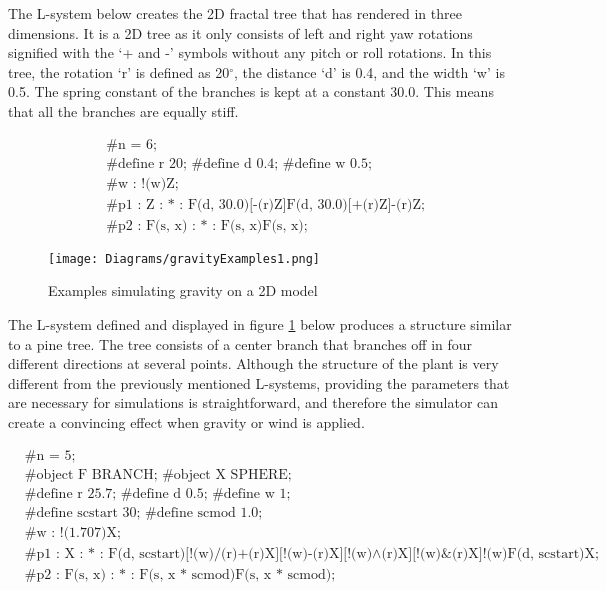 \noindent
The L-system below creates the 2D fractal tree that has rendered in three dimensions. It is a 2D tree as it only consists of left and right yaw rotations signified with the `+ and -' symbols without any pitch or roll rotations. In this tree, the rotation `r' is defined as 20$^{\circ}$, the distance `d' is 0.4, and the width `w' is 0.5. The spring constant of the branches is kept at a constant 30.0. This means that all the branches are equally stiff. 

\begin{singlespace}
\begin{equation} \label{2d L-system physics}
\begin{aligned}
	&\textrm{\#n = 6;} \\
	&\textrm{\#define r 20; \#define d 0.4; \#define w 0.5;}\\
	&\textrm{\#w : !(w)Z;}\\
	&\textrm{\#p1 : Z : * : F(d, 30.0)[-(r)Z]F(d, 30.0)[+(r)Z]-(r)Z;}\\
	&\textrm{\#p2 : F(s, x) : * : F(s, x)F(s, x);}
\end{aligned}
\end{equation}
\end{singlespace}

\begin{figure}[htbp]
	{\centering
		\vspace{7px}
		\texttt{[image: Diagrams/gravityExamples1.png]}
		\label{3DAxisFigure} \label{Gravity applied to generated model 1}
		\caption{Examples simulating gravity on a 2D model}
	}
\end{figure}
\FloatBarrier

\noindent
The L-system defined and displayed in figure \ref{Gravity applied to generated model 1} below produces a structure similar to a pine tree. The tree consists of a center branch that branches off in four different directions at several points. Although the structure of the plant is very different from the previously mentioned L-systems, providing the parameters that are necessary for simulations is straightforward, and therefore the simulator can create a convincing effect when gravity or wind is applied. 

\begin{singlespace}
\begin{equation}
\begin{aligned}
	&\textrm{\#n = 5;} \\
	&\textrm{\#object F BRANCH; \#object X SPHERE;}\\
	&\textrm{\#define r 25.7; \#define d 0.5; \#define w 1;}\\
	&\textrm{\#define scstart 30; \#define scmod 1.0;}\\
	&\textrm{\#w : !(1.707)X;}\\
	&\textrm{\#p1 : X : * : F(d, scstart)[!(w)/(r)+(r)X][!(w)-(r)X][!(w)$\land$(r)X][!(w)\&(r)X]!(w)F(d, scstart)X;}\\
	&\textrm{\#p2 : F(s, x) : * : F(s, x * scmod)F(s, x * scmod);}
\end{aligned}
\end{equation}
\end{singlespace}

